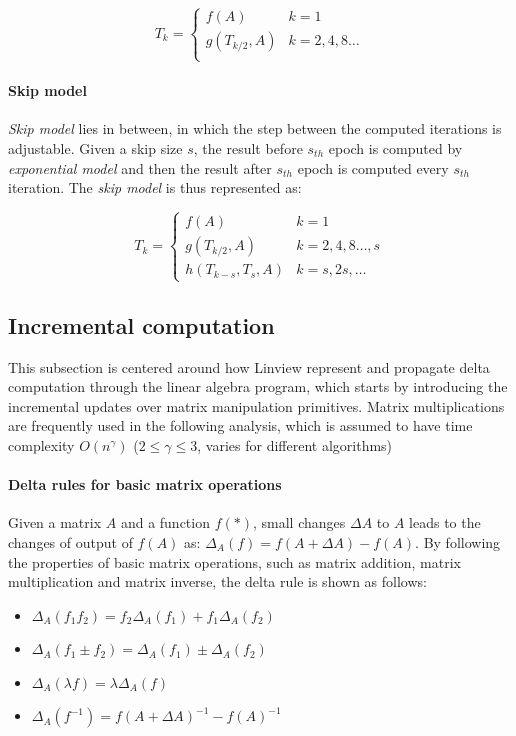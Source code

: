 \[
T_k=
\begin{cases}
f(A)& k=1\\
g(T_{k/2}, A) & k=2,4,8\dots\\
\end{cases}
\]

\paragraph{Skip model} {\em Skip model} lies in between, in which the step between the computed iterations is adjustable. Given a skip size $s$, the result before $s_{th}$ epoch is computed by {\em exponential model} and then the result after $s_{th}$ epoch is computed every $s_{th}$ iteration. The {\em skip model} is thus represented as:

\[
T_k=
\begin{cases}
f(A)& k=1\\
g(T_{k/2}, A) & k=2,4,8\dots,s\\
h(T_{k-s}, T_{s}, A) & k=s, 2s,\dots
\end{cases}
\]

\subsection{Incremental computation}
This subsection is centered around how Linview represent and propagate delta computation through the linear algebra program, which starts by introducing the incremental updates over matrix manipulation primitives. Matrix multiplications are frequently used in the following analysis, which is assumed to have time complexity $O(n^{\gamma})$ ($2\leq \gamma \leq 3$, varies for different algorithms)

\paragraph{Delta rules for basic matrix operations}
Given a matrix $A$ and a function $f(*)$, small changes $\Delta A$ to $A$ leads to the changes of output of $f(A)$ as: $\Delta_A(f) = f(A+\Delta A) - f(A)$. By following the properties of basic matrix operations, such as matrix addition, matrix multiplication and matrix inverse, the delta rule is shown as follows:

\begin{center}
    \begin{minipage}{0.4\textwidth}
      \begin{itemize}
        \item $\Delta_A(f_1 f_2) = f_2\Delta_A(f_1) + f_1\Delta_A(f_2)$
        \item $\Delta_A(f_1 \pm f_2) = \Delta_A(f_1) \pm \Delta_A(f_2)$
        \item $\Delta_A(\lambda f) = \lambda \Delta_A(f)$
        \item $\Delta_A(f^{-1}) = f(A+\Delta A)^{-1}-f(A)^{-1}$
      \end{itemize}
    \end{minipage}
  \end{center}

